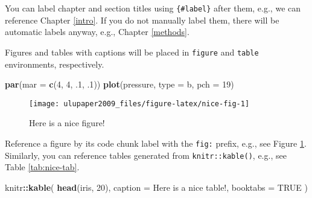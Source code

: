 \documentclass[
]{book}
\newenvironment{Shaded}{\begin{snugshade}}{\end{snugshade}}
\newcommand{\DataTypeTok}[1]{\textcolor[rgb]{0.13,0.29,0.53}{#1}}
\newcommand{\DecValTok}[1]{\textcolor[rgb]{0.00,0.00,0.81}{#1}}
\newcommand{\FloatTok}[1]{\textcolor[rgb]{0.00,0.00,0.81}{#1}}
\newcommand{\KeywordTok}[1]{\textcolor[rgb]{0.13,0.29,0.53}{\textbf{#1}}}
\newcommand{\NormalTok}[1]{#1}
\newcommand{\OperatorTok}[1]{\textcolor[rgb]{0.81,0.36,0.00}{\textbf{#1}}}
\newcommand{\OtherTok}[1]{\textcolor[rgb]{0.56,0.35,0.01}{#1}}
\newcommand{\StringTok}[1]{\textcolor[rgb]{0.31,0.60,0.02}{#1}}
\begin{document}
You can label chapter and section titles using \texttt{\{\#label\}} after them, e.g., we can reference Chapter \ref{intro}. If you do not manually label them, there will be automatic labels anyway, e.g., Chapter \ref{methods}.

Figures and tables with captions will be placed in \texttt{figure} and \texttt{table} environments, respectively.

\begin{Shaded}
\begin{Highlighting}[]
\KeywordTok{par}\NormalTok{(}\DataTypeTok{mar =} \KeywordTok{c}\NormalTok{(}\DecValTok{4}\NormalTok{, }\DecValTok{4}\NormalTok{, }\FloatTok{.1}\NormalTok{, }\FloatTok{.1}\NormalTok{))}
\KeywordTok{plot}\NormalTok{(pressure, }\DataTypeTok{type =} \StringTok{\textquotesingle{}b\textquotesingle{}}\NormalTok{, }\DataTypeTok{pch =} \DecValTok{19}\NormalTok{)}
\end{Highlighting}
\end{Shaded}

\begin{figure}

{\centering \texttt{[image: ulupaper2009\_files/figure-latex/nice-fig-1]} 

}

\caption{Here is a nice figure!}\label{fig:nice-fig}
\end{figure}

Reference a figure by its code chunk label with the \texttt{fig:} prefix, e.g., see Figure \ref{fig:nice-fig}. Similarly, you can reference tables generated from \texttt{knitr::kable()}, e.g., see Table \ref{tab:nice-tab}.

\begin{Shaded}
\begin{Highlighting}[]
\NormalTok{knitr}\OperatorTok{::}\KeywordTok{kable}\NormalTok{(}
  \KeywordTok{head}\NormalTok{(iris, }\DecValTok{20}\NormalTok{), }\DataTypeTok{caption =} \StringTok{\textquotesingle{}Here is a nice table!\textquotesingle{}}\NormalTok{,}
  \DataTypeTok{booktabs =} \OtherTok{TRUE}
\NormalTok{)}
\end{Highlighting}
\end{Shaded}
\end{document}
